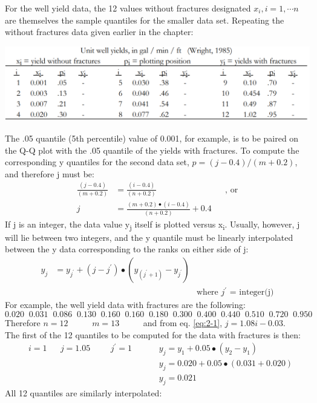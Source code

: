 \documentclass[]{book}
\begin{document}
For the well yield data, the 12 values without fractures designated \(x_{i}, i = 1, \cdots n\) are themselves the sample quantiles for the smaller data set. Repeating the without fractures data given earlier in the chapter:

\begin{center}\includegraphics[width=15.9in]{figures/2_A} \end{center}

The .05 quantile (5th percentile) value of 0.001, for example, is to be paired on the Q-Q plot with the .05 quantile of the yields with fractures. To compute the corresponding y quantiles for the second data set, \(p = (j − 0.4) / (m + 0.2)\), and therefore j must be:
\begin{equation}
\begin{aligned}
\frac{(j - 0.4)}{(m + 0.2)} & = \frac{(i - 0.4)}{(n + 0.2)} && \text{, or}\\
j & = \frac{(m + 0.2) \bullet (i - 0.4)}{(n + 0.2)} + 0.4
\end{aligned}
\label{eq:2-1}
\end{equation}
If j is an integer, the data value y\textsubscript{j} itself is plotted versus x\textsubscript{i}. Usually, however, j will lie between two integers, and the y quantile must be linearly interpolated between the y data corresponding to the ranks on either side of j:
\begin{equation}
\begin{aligned}
y_{j} & = y_{j^{\prime}} + \left( j - j^{\prime} \right) \bullet \left( y_{\left( j^{\prime} + 1 \right)} - y_{j^{\prime}} \right)\\
&& \text{where $j^{\prime}$ = integer(j)}
\end{aligned}
\label{eq:2-2}
\end{equation}
For example, the well yield data with fractures are the following:
\[0.020\;\;0.031\;\;0.086\;\;0.130\;\;0.160\;\;0.160\;\;0.180\;\;0.300\;\;0.400\;\;0.440\;\;0.510\;\;0.720\;\;0.950\]
Therefore \(n = 12\) ~ ~ ~ \(m = 13\) ~ ~ ~ and from eq. \eqref{eq:2-1}, \(j = 1.08i − 0.03\).\\
The first of the 12 quantiles to be computed for the data with fractures is then:
\begin{equation}
\begin{aligned}
& i = 1 && j = 1.05 &&& j^{\prime} = 1 &&&& y_{j} = y_{1} + 0.05 \bullet \left( y_{2} - y_{1} \right) \\
& && &&& &&&& y_{j} = 0.020 + 0.05 \bullet (0.031 + 0.020) \\
& && &&& &&&& y_{j} = 0.021
\end{aligned}
\end{equation}
All 12 quantiles are similarly interpolated:
\end{document}
